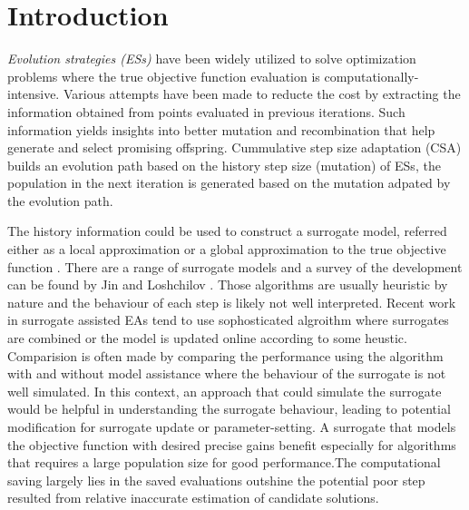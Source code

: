 \section{Introduction}


\textit{Evolution strategies (ESs)} have been widely utilized to solve optimization problems where the true objective function evaluation is computationally-intensive. Various attempts have been made to reducte the cost by extracting the information obtained from points evaluated in previous iterations. Such information yields insights into better mutation and recombination that help generate and select promising offspring. Cummulative step size adaptation (CSA) \cite{Ostermeier:1994:DAS:1326675.1326679} builds an evolution path based on the history step size (mutation) of ESs, the population in the next iteration is generated based on the mutation adpated by the evolution path. 

The history information could be used to construct a surrogate model, referred either as a local approximation or a global approximation to the true objective function \cite{Jin:2002:FAE:2955491.2955686}. There are a range of surrogate models and a survey of the development can be found by Jin \cite{JIN201161} and Loshchilov \cite{ECJ2016_LMCMA}. Those algorithms are usually heuristic by nature and the behaviour of each step is likely not well interpreted. Recent work in surrogate assisted EAs tend to use sophosticated algroithm where surrogates are combined or the model is updated online according to some heustic. Comparision is often made by comparing the performance using the algorithm with and without model assistance where the behaviour of the surrogate is not well simulated. In this context, an approach that could simulate the surrogate would be helpful in understanding the surrogate behaviour, leading to potential modification for surrogate update or parameter-setting. A surrogate that models the objective function with desired precise gains benefit especially for algorithms that requires a large population size for good performance.The computational saving largely lies in the saved evaluations outshine the potential poor step resulted from relative inaccurate estimation of candidate solutions. 


